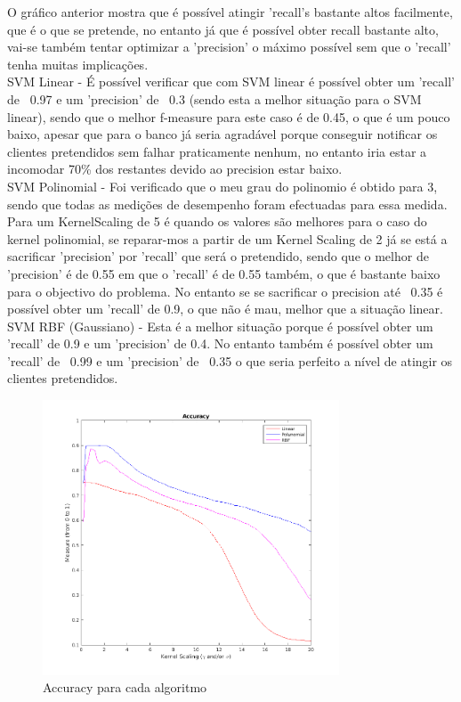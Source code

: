 \documentclass[portugues,final]{revdetua}
\begin{document}
O gráfico anterior mostra que é possível atingir 'recall's bastante altos facilmente, que é o que se pretende, no entanto já que é possível obter recall bastante alto, vai-se também tentar optimizar a 'precision' o máximo possível sem que o 'recall' tenha muitas implicações.\\

SVM Linear - É possível verificar que com SVM linear é possível obter um 'recall' de ~0.97 e um 'precision' de ~0.3 (sendo esta a melhor situação para o SVM linear), sendo que o melhor f-measure para este caso é de 0.45, o que é um pouco baixo, apesar que para o banco já seria agradável porque conseguir notificar os clientes pretendidos sem falhar praticamente nenhum, no entanto iria estar a incomodar 70\% dos restantes devido ao precision estar baixo. \\

SVM Polinomial - Foi verificado que o meu grau do polinomio é obtido para 3, sendo que todas as medições de desempenho foram efectuadas para essa medida. Para um KernelScaling de 5 é quando os valores são melhores para o caso do kernel polinomial, se reparar-mos a partir de um Kernel Scaling de 2 já se está a sacrificar 'precision' por 'recall' que será o pretendido, sendo que o melhor de 'precision' é de 0.55 em que o 'recall' é de 0.55 também, o que é bastante baixo para o objectivo do problema. No entanto se se sacrificar o precision até ~0.35 é possível obter um 'recall' de 0.9, o que não é mau, melhor que a situação linear.\\

SVM RBF (Gaussiano) - Esta é a melhor situação porque é possível obter um 'recall' de 0.9 e um 'precision' de 0.4. No entanto também é possível obter um 'recall' de ~0.99 e um 'precision' de ~0.35 o que seria perfeito a nível de atingir os clientes pretendidos.\\

\begin{figure}[H]
\centerline{\includegraphics[width=250pt]{images/svm_accuracy.png}}
\caption{Accuracy para cada algoritmo}
\label{img:complete}
\end{figure}
\end{document}
